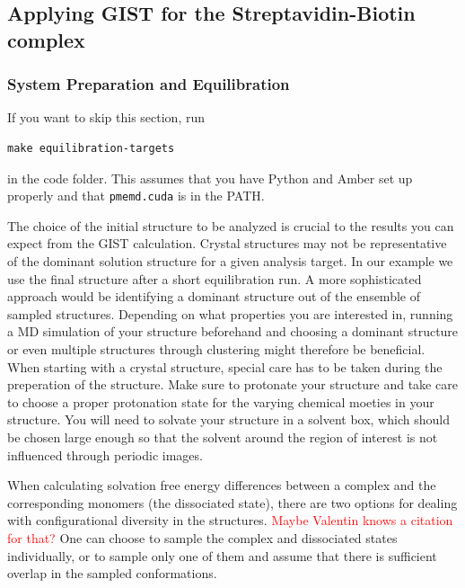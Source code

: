 \documentclass[9pt,tutorial]{livecoms}
\newcommand{\software}{\texttt}
\newcommand{\todo}{\textcolor{red}}
\begin{document}
\subsection{Applying GIST for the Streptavidin-Biotin complex}
\subsubsection{System Preparation and Equilibration}
If you want to skip this section, run 
\begin{lstlisting}[style=bash]
make equilibration-targets
\end{lstlisting}
in the code folder. This assumes that you have Python and Amber set up properly and that \software{pmemd.cuda} is in the PATH.

The choice of the initial structure to be analyzed is crucial to the results 
you can expect from the GIST calculation. Crystal structures may not be 
representative of the dominant solution structure for a given analysis target. 
In our example we use the final structure after a short equilibration run. A 
more sophisticated approach would be identifying a dominant structure out of 
the ensemble of sampled structures.  Depending on what properties you are 
interested in, running a MD simulation of your structure beforehand and 
choosing a dominant structure or even multiple structures through clustering 
might therefore be beneficial.
When starting with a crystal structure, special care has to be taken during the 
preperation of the structure. Make sure to protonate your structure and take 
care to choose a proper protonation state for the varying chemical moeties in 
your structure. You will need to solvate your structure in a solvent box, which 
should be chosen large enough so that the solvent around the region of interest 
is not influenced through periodic images.   

When calculating solvation free energy differences between a complex and the corresponding monomers (the dissociated state), there are two options for dealing with configurational diversity in the structures.
\todo{Maybe Valentin knows a citation for that?}
One can choose to sample the complex and dissociated states individually, or to sample only one of them and assume that there is sufficient overlap in the sampled conformations.
\end{document}
